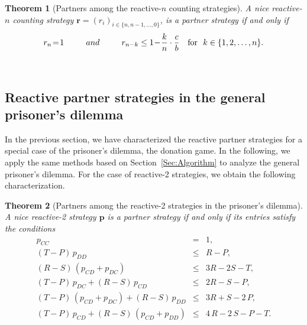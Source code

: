 \documentclass[11pt]{article}
\theoremstyle{plainCl1}
\newtheorem{theorem}{Theorem}
\theoremstyle{plainCl2}
\begin{document}
\begin{theorem}[Partners among the reactive-$n$ counting strategies]\label{theorem:reactive_counting_partner_strategies}
A nice reactive-$n$ counting strategy $\mathbf{r}\!=\!(r_i)_{i \in \{n, n-1, \dots, 0\}}$,
is a partner strategy if and only if
\begin{equation}
  r_n \!=\! 1 \qquad ~~and~~ \qquad r_{n - k} \le 1 \!-\! \frac{k}{n} \cdot \frac{c}{b} ~~~\text{\normalfont for }~ k \in \{1, 2, \dots, n\}.
\end{equation}
\end{theorem}
~


\subsection{Reactive partner strategies in the general prisoner's dilemma}\label{section:general_prisoners_dilemma}

In the previous section, we have characterized the reactive partner strategies for a special case of the prisoner's dilemma, the donation game. 
In the following, we apply the same methods based on Section~\ref{Sec:Algorithm} to analyze the general prisoner's dilemma. 
For  the case of reactive-2 strategies, we obtain the following characterization. 


\begin{theorem}[Partners among the reactive-2 strategies in the prisoner's dilemma]
\label{theorem:reactive_two_partner_strategies_PD}
A nice reactive-2 strategy $\mathbf{p}$ is a partner strategy if and only if its entries satisfy the conditions
\begin{equation}
  \begin{array}{rcl}
    p_{CC} & = & 1, \\
    (T - P)\, p_{DD} & \le & R - P, \\ 
    (R - S)\, (p_{CD} + p_{DC}) & \le & 3 R - 2 S - T, \\
    (T - P)\, p_{DC}  + (R - S)\, p_{CD} & \le & 2 R - S - P, \\ 
    (T - P)\, (p_{CD} + p_{DC}) + (R - S)\, p_{DD}  & \le & 3 R + S - 2\,P, \\
    (T - P)\, p_{CD}  + (R - S)\, (p_{CD} + p_{DD}) & \le & 4\,R - 2\,S - P - T.
\end{array}
\end{equation}
\end{theorem}
\end{document}
